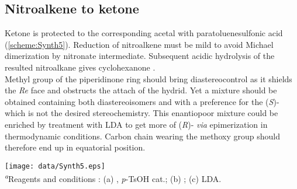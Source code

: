 \subsection*{Nitroalkene to ketone}
Ketone  is protected to the corresponding acetal  with paratoluenesulfonic acid (\ref{scheme:Synth5}). Reduction of nitroalkene   must be mild to avoid Michael dimerization by nitronate intermediate. Subsequent acidic hydrolysis of the resulted nitroalkane gives cyclohexanone . \\
Methyl group of the piperidinone ring should bring diastereocontrol as it shields the \textit{Re} face and obstructs the attach of the hydrid. Yet a mixture should be obtained containing both diastereoisomers  and  with a preference for the (\textit{S})- which is not the desired stereochemistry. This enantiopoor mixture could be enriched by treatment with LDA to get more of (\textit{R})- \textit{via} epimerization in thermodynamic conditions. Carbon chain wearing the methoxy group should therefore end up in equatorial position.
\newpage
\begin{figure''}
\centering
		\texttt{[image: data/Synth5.eps]}
    \label{scheme:Synth5}
\\
\justify
\textsf{\scriptsize{\textsuperscript{\textit{a}}Reagents and conditions : (a) , \textit{p}-TsOH cat.; (b) ; (c) LDA.}}
\end{figure''}
